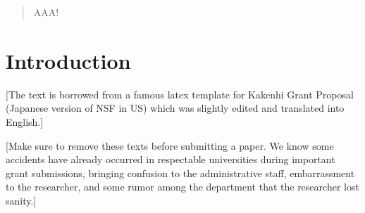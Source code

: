 %
%
%
%
%
%
%
%
%
%
%
%
\begin{abstract}
AAA!
\end{abstract}





\section{Introduction}

[The text is borrowed from a famous latex template for Kakenhi Grant
Proposal (Japanese version of NSF in US) which was slightly edited and translated into English.]

[Make sure to remove these texts before submitting a paper.
We know some accidents have already occurred in respectable universities during important grant submissions,
bringing confusion to the administrative staff, embarrassment to the researcher,
and some rumor among the department that the researcher lost sanity.]


